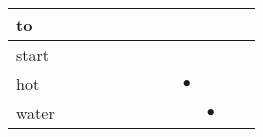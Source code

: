 \documentclass[landscape]{article}
\newcommand{\ssp}{\hspace{2pt}}
\newcommand{\mex}{\cellcolor{g}$\bullet$}
\begin{document}
\begin{tabular}{|l|p{10pt}|p{10pt}|p{10pt}|p{10pt}|p{10pt}|p{10pt}|p{10pt}|p{10pt}|p{10pt}|p{10pt}|p{10pt}|}
\hline
\ssp to \ssp&\hspace{2pt}&\hspace{2pt}&\hspace{2pt}&\hspace{2pt}&\hspace{2pt}&\hspace{2pt}&\hspace{2pt}&\hspace{2pt}&\hspace{2pt}&\hspace{2pt}&\hspace{2pt}\\
\hline
\ssp start \ssp&\hspace{2pt}&\hspace{2pt}&\hspace{2pt}&\hspace{2pt}&\hspace{2pt}&\hspace{2pt}&\hspace{2pt}&\hspace{2pt}&\hspace{2pt}&\hspace{2pt}&\hspace{2pt}\\
\hline
\ssp \cellcolor{ref7}hot \ssp&\hspace{2pt}&\hspace{2pt}&\hspace{2pt}&\hspace{2pt}&\hspace{2pt}&\hspace{2pt}&\hspace{2pt}&\hspace{2pt}\mex&\hspace{2pt}&\hspace{2pt}&\hspace{2pt}\\
\hline
\ssp \cellcolor{ref8}water \ssp&\hspace{2pt}&\hspace{2pt}&\hspace{2pt}&\hspace{2pt}&\hspace{2pt}&\hspace{2pt}&\hspace{2pt}&\hspace{2pt}&\hspace{2pt}\mex&\hspace{2pt}&\hspace{2pt}\\

\end{tabular}
\end{document}
